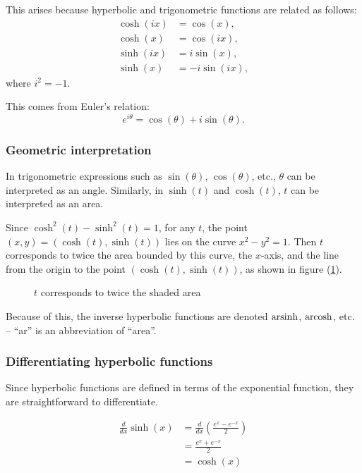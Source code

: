 	This arises because hyperbolic and trigonometric functions are related as follows:
	  \begin{align*}
		  \cosh(ix) & = \cos(x),  \\
			\cosh(x) & = \cos(ix),  \\
			\sinh(ix) & = i\sin(x),  \\
			\sinh(x) & = -i\sin(ix),
		\end{align*}
	where \(i^2 = -1\).
	
	This comes from Euler's relation:
	  \[
		  e^{i\theta} = \cos(\theta) + i\sin(\theta).
		\]
		
		
\subsubsection*{Geometric interpretation}

In trigonometric expressions such as \(\sin(\theta)\), \(\cos(\theta)\), etc., \(\theta\) can be interpreted as an angle.  Similarly, in \(\sinh(t)\) and \(\cosh(t)\), \(t\) can be interpreted as an area.

Since \(\cosh^2(t) - \sinh^2(t) = 1\), for any \(t\), the point \((x, y) = (\cosh(t), \sinh(t))\) lies on the curve \(x^2 - y^2 = 1\).  Then \(t\) corresponds to twice the area bounded by this curve, the \(x\)-axis, and the line from the origin to the point \((\cosh(t), \sinh(t))\), as shown in figure (\ref{inversehyperbolicarea}).

  \begin{figure}[H]
    \centering
    \def\svgwidth{0.8\columnwidth}
    
    \caption{$t$ corresponds to twice the shaded area}
    \label{inversehyperbolicarea}
  \end{figure}

Because of this, the inverse hyperbolic functions are denoted \(\operatorname{arsinh}\), \(\operatorname{arcosh}\), etc. -- ``ar'' is an abbreviation of ``area''.


\subsubsection*{Differentiating hyperbolic functions}

Since hyperbolic functions are defined in terms of the exponential function, they are straightforward to differentiate.

\begin{align*}
  \frac{d}{dx}\sinh(x) & = \frac{d}{dx}\left(\frac{e^x - e^{-x}}{2}\right)  \\
                       & = \frac{e^x + e^{-x}}{2}  \\
                       & = \cosh(x)
\end{align*}

